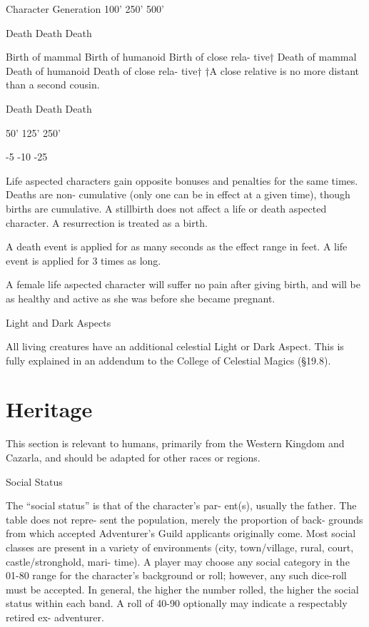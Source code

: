 \begin{Chapter}{Character Generation}
100’ 
250’ 
500’ 

Death  
Death  
Death  

Birth of mammal  
Birth of humanoid  
Birth of close rela-
tive†  
Death of mammal  
Death of humanoid  
Death of close rela-
tive†  
†A  close  relative  is  no  more  distant  than  a  second 
cousin. 

Death  
Death  
Death  

50’  
125’ 
250’ 

-5 
-10 
-25 

Life aspected characters gain opposite bonuses and 
penalties  for  the  same  times.  Deaths  are  non-
cumulative  (only  one  can  be  in  effect  at  a  given 
time),  though  births  are  cumulative.  A  stillbirth 
does not affect a life or death aspected character. A 
resurrection is treated as a birth. 

A death event is applied for as many seconds as the 
effect  range  in  feet.  A  life  event  is  applied  for  3 
times as long. 

A female life aspected character will suffer no pain 
after giving birth, and will be as healthy and active 
as she was before she became pregnant. 

Light and Dark Aspects 

All  living  creatures  have  an  additional  celestial 
Light or Dark Aspect. This is fully explained in an 
addendum  to  the  College  of  Celestial  Magics 
(§19.8). 

\section{Heritage}

This section is relevant to humans, primarily from the Western Kingdom
and Cazarla, and should be adapted for other races or regions.

Social Status 

The  “social  status”  is  that  of  the  character’s  par-
ent(s), usually the father. The table does not repre-
sent the population, merely the proportion of back-
grounds  from  which  accepted  Adventurer’s  Guild 
applicants originally come. Most social classes are 
present 
in  a  variety  of  environments  (city, 
town/village,  rural,  court,  castle/stronghold,  mari-
time). A player may choose any social category in 
the  01-80  range  for  the  character’s  background  or 
roll; however, any such dice-roll must be accepted. 
In general, the higher the number rolled, the higher 
the social status within each band. A roll of 40-90 
optionally  may  indicate  a  respectably  retired  ex-
adventurer. 


\end{Chapter}
